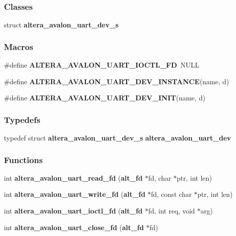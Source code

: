 \subsubsection*{Classes}
\begin{DoxyCompactItemize}
\item 
struct {\bf altera\+\_\+avalon\+\_\+uart\+\_\+dev\+\_\+s}
\end{DoxyCompactItemize}
\subsubsection*{Macros}
\begin{DoxyCompactItemize}
\item 
\#define {\bf A\+L\+T\+E\+R\+A\+\_\+\+A\+V\+A\+L\+O\+N\+\_\+\+U\+A\+R\+T\+\_\+\+I\+O\+C\+T\+L\+\_\+\+FD}~N\+U\+LL
\item 
\#define {\bf A\+L\+T\+E\+R\+A\+\_\+\+A\+V\+A\+L\+O\+N\+\_\+\+U\+A\+R\+T\+\_\+\+D\+E\+V\+\_\+\+I\+N\+S\+T\+A\+N\+CE}(name,  d)
\item 
\#define {\bf A\+L\+T\+E\+R\+A\+\_\+\+A\+V\+A\+L\+O\+N\+\_\+\+U\+A\+R\+T\+\_\+\+D\+E\+V\+\_\+\+I\+N\+IT}(name,  d)
\end{DoxyCompactItemize}
\subsubsection*{Typedefs}
\begin{DoxyCompactItemize}
\item 
typedef struct {\bf altera\+\_\+avalon\+\_\+uart\+\_\+dev\+\_\+s} {\bf altera\+\_\+avalon\+\_\+uart\+\_\+dev}
\end{DoxyCompactItemize}
\subsubsection*{Functions}
\begin{DoxyCompactItemize}
\item 
int {\bf altera\+\_\+avalon\+\_\+uart\+\_\+read\+\_\+fd} ({\bf alt\+\_\+fd} $\ast$fd, char $\ast$ptr, int len)
\item 
int {\bf altera\+\_\+avalon\+\_\+uart\+\_\+write\+\_\+fd} ({\bf alt\+\_\+fd} $\ast$fd, const char $\ast$ptr, int len)
\item 
int {\bf altera\+\_\+avalon\+\_\+uart\+\_\+ioctl\+\_\+fd} ({\bf alt\+\_\+fd} $\ast$fd, int req, void $\ast$arg)
\item 
int {\bf altera\+\_\+avalon\+\_\+uart\+\_\+close\+\_\+fd} ({\bf alt\+\_\+fd} $\ast$fd)
\end{DoxyCompactItemize}


